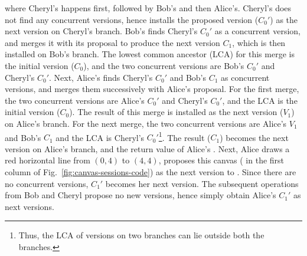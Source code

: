 where Cheryl's  happens first, followed by Bob's and then
Alice's.  Cheryl's  does not find any concurrent versions,
hence installs the proposed version ($C_0'$) as the next version on
Cheryl's branch. Bob's  finds Cheryl's $C_0'$ as a concurrent
version, and merges it with its proposal to produce the next version
$C_1$, which is then installed on Bob's branch.  The lowest common
ancestor (LCA) for this merge is the initial version ($C_0$), and the
two concurrent versions are Bob's $C_0'$ and Cheryl's $C_0'$. Next,
Alice's  finds Cheryl's $C_0'$ and Bob's $C_1$ as concurrent
versions, and merges them successively with Alice's proposal. For the
first merge, the two concurrent versions are Alice's $C_0'$ and
Cheryl's $C_0'$, and the LCA is the initial version ($C_0$). The
result of this merge is installed as the next version ($V_1$) on
Alice's branch. For the next merge, the two concurrent versions are
Alice's $V_1$ and Bob's $C_1$ and the LCA is Cheryl's
$C_0'$\footnote{Thus, the LCA of versions on two branches can lie
  outside both the branches.}. The result ($C_1$) becomes the next
version on Alice's branch, and the return value of Alice's .
Next, Alice draws a red horizontal line from $(0,4)$ to $(4,4)$,
proposes this canvas ( in the first column of
Fig.~\ref{fig:canvas-sessions-code}) as the next version to .
Since there are no concurrent versions, $C_1'$ becomes her next
version. The subsequent  operations from Bob and Cheryl
propose no new versions, hence simply obtain Alice's $C_1'$ as next
versions.
